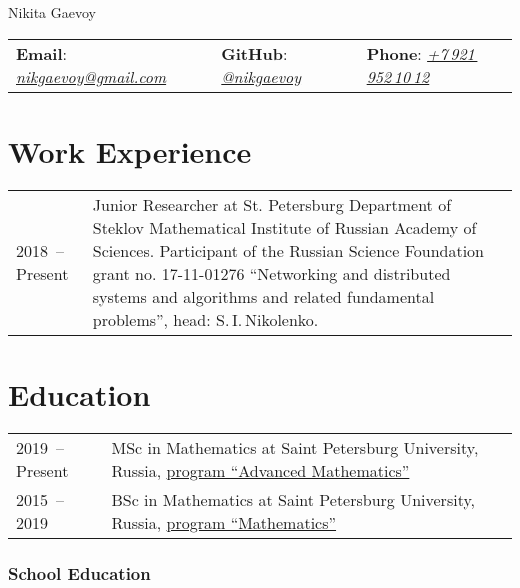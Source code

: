 \documentclass[a4paper, 11pt]{article}
\begin{document}


\begin{center}
    {\Huge Nikita Gaevoy}
\end{center}

\begin{center}
    \begin{tabular}{lll}
        \textbf{Email}: \href{mailto:nikgaevoy@gmail.com}{{\it nikgaevoy@gmail.com}} &
        \hspace{0.13cm} \textbf{GitHub}: \href{https://github.com/nikgaevoy}{{\it @nikgaevoy}} &
        \hspace{0.13cm} \textbf{Phone}: \href{tel:+79219521012}{{\it +7\,921\,952\,10\,12}}
    \end{tabular}
\end{center}

\section*{Work Experience}

\begin{tabularx}{\textwidth}{lX}
    2018~-- Present & Junior Researcher at St. Petersburg Department of Steklov Mathematical Institute of Russian Academy of Sciences. Participant of the Russian Science Foundation grant no. 17-11-01276 ``Networking and distributed systems and algorithms and related fundamental problems'', head: S.\,I.\,Nikolenko.
    \\
\end{tabularx}


\section*{Education}

\begin{tabularx}{\textwidth}{lX}
    2019~-- Present & MSc in Mathematics at Saint Petersburg University, Russia, \href{https://math-cs.spbu.ru/en/msc-math-en/}{program ``Advanced Mathematics''} \\
    2015~-- 2019 & BSc in Mathematics at Saint Petersburg University, Russia, \href{https://math-cs.spbu.ru/en/}{program ``Mathematics''} 
\end{tabularx}

\subsubsection*{School Education}
\end{document}
